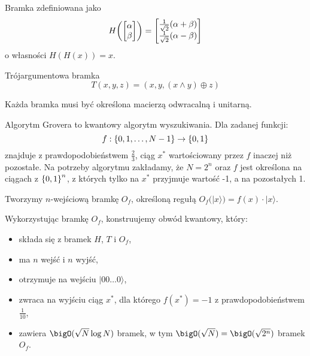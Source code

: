 \begin{definition}
	Bramka zdefiniowana jako
	\[
		H\pars{\begin{bmatrix} \alpha \\ \beta \end{bmatrix}} = \begin{bmatrix} \frac{1}{\sqrt{2}}(\alpha + \beta) \\ \frac{1}{\sqrt{2}}(\alpha - \beta) \end{bmatrix}
	\]
	o własności \( H(H(x)) = x \).
\end{definition}

\begin{definition}
	Trójargumentowa bramka
	\[ T(x, y, z) = (x, y, (x \land y) \oplus z) \]
\end{definition}
Każda bramka musi być określona macierzą odwracalną i unitarną.

Algorytm Grovera to kwantowy algorytm wyszukiwania. Dla zadanej funkcji:
\[
	f : \set{0, 1, \ldots, N - 1} \rightarrow \set{0, 1}
\]
znajduje z prawdopodobieństwem \( \frac{2}{3} \), ciąg \( x^{*} \) wartościowany przez \( f \) inaczej niż pozostałe.
Na potrzeby algorytmu zakładamy, że \( N = 2^n \) oraz \( f \) jest określona na ciągach z \( \set{0, 1}^n \), z których tylko na \( x^{*} \) przyjmuje wartość -1, a na pozostałych 1.

Tworzymy \( n \)-wejściową bramkę \( O_f \), określoną regułą \( O_f (|x\rangle) = f(x) \cdot |x \rangle \).

Wykorzystując bramkę \( O_f \), konstruujemy obwód kwantowy, który:
\begin{itemize}
	\item składa się z bramek \( H \), \( T \) i \( O_f \),
	\item ma \( n \) wejść i \( n \) wyjść,
	\item otrzymuje na wejściu \( |00\ldots0 \rangle \),
	\item zwraca na wyjściu ciąg \( x^{*} \), dla którego \( f(x^{*}) = -1 \) z prawdopodobieństwem \( \frac{1}{10} \),
	\item zawiera \( \bigO(\sqrt{N} \log N) \) bramek, w tym \( \bigO(\sqrt{N}) = \bigO(\sqrt{2^n}) \) bramek \( O_f \).
\end{itemize}

